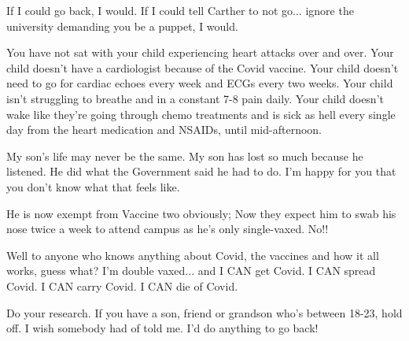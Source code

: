 If I could go back, I would. If I could tell Carther to not go... ignore the
university demanding you be a puppet, I would.

You have not sat with your child experiencing heart attacks over and over. Your
child doesn’t have a cardiologist because of the Covid vaccine. Your child
doesn’t need to go for cardiac echoes every week and ECGs every two weeks. Your
child isn’t struggling to breathe and in a constant 7-8 pain daily. Your child
doesn’t wake like they’re going through chemo treatments and is sick as hell
every single day from the heart medication and NSAIDs, until mid-afternoon.

My son’s life may never be the same. My son has lost so much because he
listened. He did what the Government said he had to do. I’m happy for you that
you don’t know what that feels like.

He is now exempt from Vaccine two obviously; Now they expect him to swab his
nose twice a week to attend campus as he’s only single-vaxed. No!!

Well to anyone who knows anything about Covid, the vaccines and how it all
works, guess what? I’m double vaxed... and I CAN get Covid. I CAN spread
Covid. I CAN carry Covid. I CAN die of Covid.

Do your research. If you have a son, friend or grandson who’s between 18-23,
hold off. I wish somebody had of told me. I’d do anything to go back!
